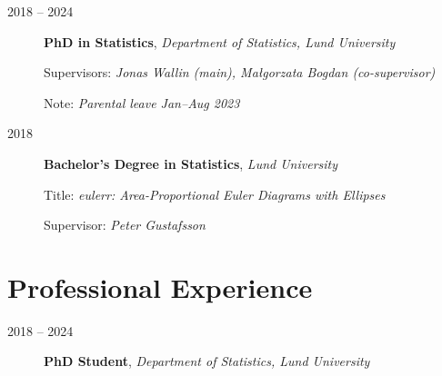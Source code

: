 \documentclass[english,a4paper]{article}
\renewcommand*{%
  \mkbibnamegiven
}[1]{\ifitemannotation{highlight}{\textbf{#1}}{#1}}
\renewcommand*{%
  \mkbibnamefamily
}[1]{\ifitemannotation{highlight}{\textbf{#1}}{#1}}
\begin{document}
\begin{description}
  \item[2018 -- 2024] {
        \textbf{PhD in Statistics}, \emph{Department of Statistics, Lund
          University}

        Supervisors: \emph{Jonas Wallin (main), Małgorzata Bogdan (co-supervisor)}

        Note: \emph{Parental leave Jan--Aug 2023}

        }

  \item[2018] {
        \textbf{Bachelor's Degree in Statistics}, \emph{Lund University}

        Title: \emph{eulerr: Area-Proportional Euler Diagrams with Ellipses}

        Supervisor: \emph{Peter Gustafsson}
        }

\end{description}

\section{Professional Experience}

\begin{description}
  \item[2018 -- 2024] {
        \textbf{PhD Student}, \emph{Department of Statistics, Lund University}

        }
\end{description}
\end{document}
